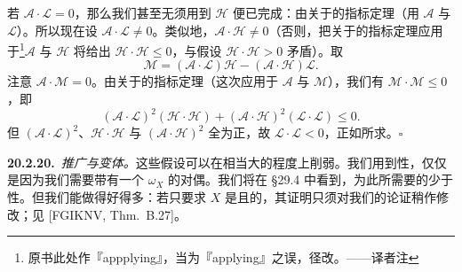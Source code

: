 若 $\mathscr{A}\cdot\mathscr{L}=0$，那么我们甚至无须用到 $\mathscr{H}$ 便已完成：由关于\trAmple\trLineBundle{}的\trHodge{}指标定理（用 $\mathscr{A}$ 与 $\mathscr{L}$）。所以现在设 $\mathscr{A}\cdot\mathscr{L}\ne 0$。类似地，$\mathscr{A}\cdot\mathscr{H}\ne 0$（否则，把关于\trAmple\trLineBundle{}的\trHodge{}指标定理应用于\footnote{原书此处作『appplying』，当为『applying』之误，径改。——译者注}$\mathscr{A}$ 与 $\mathscr{H}$ 将给出 $\mathscr{H}\cdot\mathscr{H}\le 0$，与假设 $\mathscr{H}\cdot\mathscr{H}>0$ 矛盾）。取
\begin{equation*}\tag{20.2.19.1}\label{eq:hodge-index-m-combination}
\mathscr{M}=(\mathscr{A}\cdot\mathscr{L})\mathscr{H}-(\mathscr{A}\cdot\mathscr{H})\mathscr{L}.
\end{equation*}
注意 $\mathscr{A}\cdot\mathscr{M}=0$。由关于\trAmple\trLineBundle{}的\trHodge{}指标定理（这次应用于 $\mathscr{A}$ 与 $\mathscr{M}$），我们有 $\mathscr{M}\cdot\mathscr{M}\le 0$，即
\[
(\mathscr{A}\cdot\mathscr{L})^2(\mathscr{H}\cdot\mathscr{H})+(\mathscr{A}\cdot\mathscr{H})^2(\mathscr{L}\cdot\mathscr{L})\le 0.
\]
但 $(\mathscr{A}\cdot\mathscr{L})^2$、$\mathscr{H}\cdot\mathscr{H}$ 与 $(\mathscr{A}\cdot\mathscr{H})^2$ 全为正，故 $\mathscr{L}\cdot\mathscr{L}<0$，正如所求。\hfill$\square$

\textbf{20.2.20.}\ \emph{推广与变体。}\quad 这些假设可以在相当大的程度上削弱。我们用到\trSmooth{}性，仅仅是因为我们需要带有一个\trInvertibleSheaf{} $\omega_X$ 的\trSerre{}对偶。我们将在 \S29.4 中看到，为此所需要的少于\trSmooth{}性。但我们能做得好得多：若只要求 $X$ 是\trGeometricallyIrreducible{}且\trProper{}的，其证明只须对我们的论证稍作修改；见 [FGIKNV, Thm.~B.27]。
